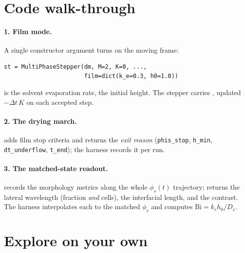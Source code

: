 \section{Code walk-through}

\paragraph{1. Film mode.} A single constructor argument turns on the
moving frame:
\begin{lstlisting}
st = MultiPhaseStepper(dm, M=2, K=0, ...,
                       film=dict(k_e=0.3, h0=1.0))
\end{lstlisting}
 is the solvent evaporation rate,  the initial
height. The stepper carries , updated $-\Delta t\,K$ on each
accepted step.

\paragraph{2. The drying march.}  adds film stop criteria and returns the \emph{exit reason}
(\texttt{phis\_stop}, \texttt{h\_min}, \texttt{dt\_underflow},
\texttt{t\_end}); the harness records it per run.

\paragraph{3. The matched-state readout.}  records the
morphology metrics along the whole $\phi_s(t)$ trajectory;
 returns the lateral wavelength (fraction
\emph{and} cells), the interfacial length, and the contrast. The harness
interpolates each to the matched $\phi_s$ and computes
$\mathrm{Bi}=k_e h_0/D_s$.

\section{Explore on your own}



